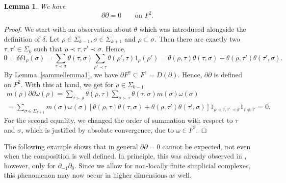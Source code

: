 \documentclass[10pt]{amsart}
\newtheorem{lemma}[theorem]{Lemma}
\theoremstyle{definition}
\newcommand{\F}{{F}}
\begin{document}
 
\begin{lemma}\label{pp0} We have
$$\partial\partial = 0 \qquad \mbox{on $\F^{2}$}.$$   
\end{lemma}
\begin{proof}
   We start with an observation about $\theta$ which was introduced alongside the definition of $\delta$. Let $\rho\in\Sigma_{k-1},\sigma\in\Sigma_{k+1}$ and $\rho\subset\sigma.$ Then there are exactly two $\tau,\tau'\in\Sigma_k$ such that $\rho\prec\tau,\tau'\prec\sigma.$ Hence,
    $$0= \delta\delta1_\rho(\sigma) = \sum_{\tau\prec\sigma}\theta(\tau,\sigma)\sum_{\rho'\prec\tau}\theta(\rho',\tau)1_\rho(\rho') = \theta(\rho,\tau)\theta(\tau,\sigma) + \theta(\rho,\tau')\theta(\tau',\sigma).$$
    By  Lemma~\ref{sammellemma1}, we have $\partial \F^{2}\subseteq \F^{1}=D(\partial)$. Hence, $\partial\partial$ is defined on $\F^{2}$. With this at hand, we get for $\rho\in\Sigma_{k-1}$
    \begin{multline*}
        m(\rho)\partial\partial\omega(\rho)  = \sum_{\tau\succ \rho}\theta(\rho,\tau)\sum_{\sigma\succ \tau}\theta(\tau,\sigma)m(\sigma)\omega(\sigma)\\
        = \sum_{\sigma\in\Sigma_{k+1}}m(\sigma)\omega(\sigma)\left[\theta(\rho,\tau)\theta(\tau,\sigma) + \theta(\rho,\tau')\theta(\tau',\sigma)\right]1_{\rho\prec\tau,\tau'\prec\sigma}1_{\tau\neq\tau'} = 0.
    \end{multline*}   
    For the second equality, we changed the order of summation with respect to $\tau$ and $\sigma$, which is justified by absolute convergence, due to $\omega\in F^2.$
\end{proof}
The following example shows that in general $\partial\partial = 0$ cannot be expected, not even when the composition is well defined. In principle, this was already observed in \cite{Parzanchevski}, however, only for $\partial_{-1}\partial_{0}.$ Since we allow for non-locally finite simplicial complexes, this phenomenon may now occur in higher dimensions as well.
\end{document}
